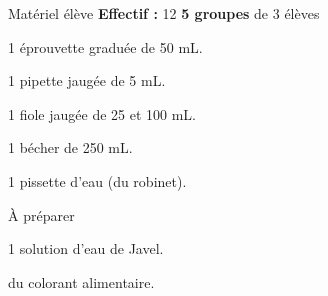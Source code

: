 
\begin{boiteMateriel}{Matériel élève}
  \textbf{Effectif :} 12
  \qq{}\qq{}
  \flecheLongue \textbf{5 groupes} de 3 élèves

  \begin{protocole}
    \item 1 éprouvette graduée de 50 mL.
    \item 1 pipette jaugée de 5 mL.
    \item 1 fiole jaugée de 25 et 100 mL.
    \item 1 bécher de 250 mL.
    \item 1 pissette d'eau (du robinet).
  \end{protocole}
\end{boiteMateriel}


\begin{boiteMateriel}{À préparer}
  \begin{protocole}
    \item 1 solution d'eau de Javel.
    \item du colorant alimentaire.
  \end{protocole}
\end{boiteMateriel}
